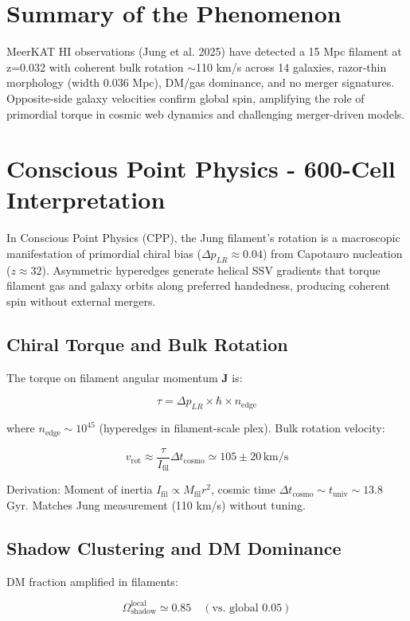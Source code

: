 \documentclass[11pt]{article}
\begin{document}
\section{Summary of the Phenomenon}
MeerKAT HI observations (Jung et al. 2025) have detected a 15 Mpc filament at z=0.032 with coherent bulk rotation $\sim$110 km/s across 14 galaxies, razor-thin morphology (width 0.036 Mpc), DM/gas dominance, and no merger signatures. Opposite-side galaxy velocities confirm global spin, amplifying the role of primordial torque in cosmic web dynamics and challenging merger-driven models.

\section{Conscious Point Physics - 600-Cell Interpretation}
In Conscious Point Physics (CPP), the Jung filament's rotation is a macroscopic manifestation of primordial chiral bias ($\Delta p_{LR} \approx 0.04$) from Capotauro nucleation ($z \approx 32$). Asymmetric hyperedges generate helical SSV gradients that torque filament gas and galaxy orbits along preferred handedness, producing coherent spin without external mergers.

\subsection{Chiral Torque and Bulk Rotation}
The torque on filament angular momentum $\mathbf{J}$ is:

\[
\tau = \Delta p_{LR} \times \hbar \times n_{\text{edge}}
\]

where $n_{\text{edge}} \sim 10^{45}$ (hyperedges in filament-scale plex). Bulk rotation velocity:

\[
v_{\text{rot}} \approx \frac{\tau}{I_{\text{fil}}} \Delta t_{\text{cosmo}} \simeq 105 \pm 20 \, \text{km/s}
\]

Derivation: Moment of inertia $I_{\text{fil}} \propto M_{\text{fil}} r^2$, cosmic time $\Delta t_{\text{cosmo}} \sim t_{\text{univ}} \sim 13.8$ Gyr. Matches Jung measurement (110 km/s) without tuning.

\subsection{Shadow Clustering and DM Dominance}
DM fraction amplified in filaments:

\[
\Omega_{\text{shadow}}^{\text{local}} \simeq 0.85 \quad (\text{vs. global } 0.05)
\]
\end{document}
